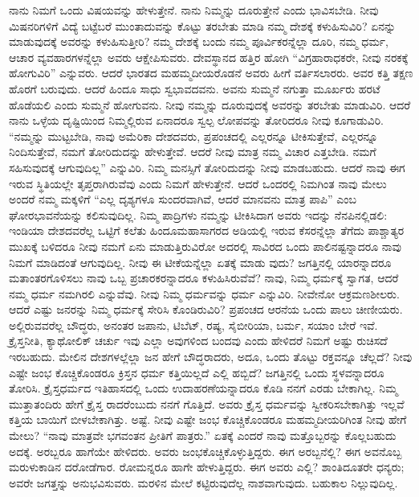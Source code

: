 ನಾನು ನಿಮಗೆ ಒಂದು ವಿಷಯವನ್ನು ಹೇಳುತ್ತೇನೆ. ನಾನು ನಿಮ್ಮನ್ನು ದೂರುತ್ತೇನೆ ಎಂದು ಭಾವಿಸಬೇಡಿ. ನೀವು ಮಿಷನರಿಗಳಿಗೆ ವಿದ್ಯೆ ಬಟ್ಟೆಬರೆ ಮುಂತಾದುವನ್ನು ಕೊಟ್ಟು ತರಬೇತು ಮಾಡಿ ನಮ್ಮ ದೇಶಕ್ಕೆ ಕಳುಹಿಸುವಿರಿ? ಏನನ್ನು ಮಾಡುವುದಕ್ಕೆ ಅವರನ್ನು ಕಳುಹಿಸುತ್ತೀರಿ? ನಮ್ಮ ದೇಶಕ್ಕೆ ಬಂದು ನಮ್ಮ ಪೂರ್ವಿಕರನ್ನೆಲ್ಲಾ ದೂರಿ, ನಮ್ಮ ಧರ್ಮ, ಆಚಾರ ವ್ಯವಹಾರಗಳನ್ನೆಲ್ಲಾ ಅವರು ಆಕ್ಷೇಪಿಸುವರು. ದೇವಸ್ಥಾನದ ಹತ್ತಿರ ಹೋಗಿ “ವಿಗ್ರಹಾರಾಧಕರೇ, ನೀವು ನರಕಕ್ಕೆ ಹೋಗುವಿರಿ” ಎನ್ನುವರು. ಆದರೆ ಭಾರತದ ಮಹಮ್ಮದೀಯರೊಡನೆ ಅವರು ಹೀಗೆ ವರ್ತಿಸಲಾರರು. ಅವರ ಕತ್ತಿ ತಕ್ಷಣ ಹೊರಗೆ ಬರುವುದು. ಆದರೆ ಹಿಂದೂ ಸಾಧು ಸ್ವಭಾವದವನು. ಅವನು ಸುಮ್ಮನೆ ನಗುತ್ತಾ ಮೂರ್ಖರು ಹರಟೆ ಹೊಡೆಯಲಿ ಎಂದು ಸುಮ್ಮನೆ ಹೋಗುವನು. ನೀವು ನಮ್ಮನ್ನು ದೂರುವುದಕ್ಕೆ ಅವರನ್ನು ತರಬೇತು ಮಾಡುವಿರಿ. ಆದರೆ ನಾನು ಒಳ್ಳೆಯ ದೃಷ್ಟಿಯಿಂದ ನಿಮ್ಮಲ್ಲಿರುವ ಏನಾದರೂ ಸ್ವಲ್ಪ ಲೋಪವನ್ನು ತೋರಿದರೂ ನೀವು ಕೂಗಾಡುವಿರಿ. “ನಮ್ಮನ್ನು ಮುಟ್ಟಬೇಡಿ, ನಾವು ಅಮೆರಿಕಾ ದೇಶದವರು, ಪ್ರಪಂಚದಲ್ಲಿ ಎಲ್ಲರನ್ನೂ ಟೀಕಿಸುತ್ತೇವೆ, ಎಲ್ಲರನ್ನೂ ನಿಂದಿಸುತ್ತೇವೆ, ನಮಗೆ ತೋರಿದುದನ್ನು ಹೇಳುತ್ತೇವೆ. ಆದರೆ ನೀವು ಮಾತ್ರ ನಮ್ಮ ವಿಚಾರ ಎತ್ತಬೇಡಿ. ನಮಗೆ ಸಹಿಸುವುದಕ್ಕೆ ಆಗುವುದಿಲ್ಲ” ಎನ್ನುವಿರಿ. ನಿಮ್ಮ ಮನಸ್ಸಿಗೆ ತೋರಿದುದನ್ನು ನೀವು ಮಾಡಬಹುದು. ಆದರೆ ನಾವು ಈಗ ಇರುವ ಸ್ಥಿತಿಯಲ್ಲೇ ತೃಪ್ತರಾಗಿರುವೆವು ಎಂದು ನಿಮಗೆ ಹೇಳುತ್ತೇನೆ. ಆದರೆ ಒಂದರಲ್ಲಿ ನಿಮಗಿಂತ ನಾವು ಮೇಲು ಅಂದರೆ ನಮ್ಮ ಮಕ್ಕಳಿಗೆ “ಎಲ್ಲ ದೃಶ್ಯಗಳೂ ಸುಂದರವಾಗಿವೆ, ಆದರೆ ಮಾನವನು ಮಾತ್ರ ಪಾಪಿ” ಎಂಬ ಘೋರಭಾವನೆಯನ್ನು ಕಲಿಸುವುದಿಲ್ಲ. ನಿಮ್ಮ ಪಾದ್ರಿಗಳು ನಮ್ಮನ್ನು ಟೀಕಿಸಿದಾಗ ಅವರು ಇದನ್ನು ನೆನಪಿನಲ್ಲಿಡಲಿ: ಇಂಡಿಯಾ ದೇಶದವರೆಲ್ಲ ಒಟ್ಟಿಗೆ ಕಲೆತು ಹಿಂದೂಮಹಾಸಾಗರದ ಅಡಿಯಲ್ಲಿ ಇರುವ ಕೆಸರನ್ನೆಲ್ಲಾ ತೆಗೆದು ಪಾಶ್ಚಾತ್ಯರ ಮುಖಕ್ಕೆ ಬಳಿದರೂ ನೀವು ನಮಗೆ ಏನು ಮಾಡುತ್ತಿರುವಿರೋ ಅದರಲ್ಲಿ ಸಾವಿರದ ಒಂದು ಪಾಲಿನಷ್ಟನ್ನಾದರೂ ನಾವು ನಿಮಗೆ ಮಾಡಿದಂತೆ ಆಗುವುದಿಲ್ಲ. ನೀವು ಈ ಟೀಕೆಯನ್ನೆಲ್ಲಾ ಏತಕ್ಕೆ ಮಾಡು ವುದು? ಜಗತ್ತಿನಲ್ಲಿ ಯಾರನ್ನಾದರೂ ಮತಾಂತರಗೊಳಿಸಲು ನಾವು ಒಬ್ಬ ಪ್ರಚಾರಕರನ್ನಾದರೂ ಕಳುಹಿಸಿರುವೆವೆ? ನಾವು, ನಿಮ್ಮ ಧರ್ಮಕ್ಕೆ ಸ್ವಾಗತ, ಆದರೆ ನಮ್ಮ ಧರ್ಮ ನಮಗಿರಲಿ ಎನ್ನುವೆವು. ನೀವು ನಿಮ್ಮ ಧರ್ಮವನ್ನು ಧರ್ಮ ಎನ್ನುವಿರಿ. ನೀವೇನೋ ಆಕ್ರಮಣಶೀಲರು. ಆದರೆ ಎಷ್ಟು ಜನರನ್ನು ನಿಮ್ಮ ಧರ್ಮಕ್ಕೆ ಸೇರಿಸಿ ಕೊಂಡಿರುವಿರಿ? ಪ್ರಪಂಚದ ಆರನೆಯ ಒಂದು ಪಾಲು ಚೀಣೀಯರು. ಅಲ್ಲಿರುವವರೆಲ್ಲ ಬೌದ್ಧರು, ಅನಂತರ ಜಪಾನು, ಟಿಬೆಟ್​, ರಷ್ಯ, ಸೈಬೀರಿಯಾ, ಬರ್ಮ, ಸಯಾಂ ಬೇರೆ ಇವೆ. ಕ್ರೈಸ್ತನೀತಿ, ಕ್ಯಾಥೋಲಿಕ್​ ಚರ್ಚು ಇವು ಎಲ್ಲಾ ಅವುಗಳಿಂದ ಬಂದವು ಎಂದು ಹೇಳಿದರೆ ನಿಮಗೆ ಅಷ್ಟು ರುಚಿಸದೆ ಇರಬಹುದು. ಮೇಲಿನ ದೇಶಗಳಲ್ಲೆಲ್ಲಾ ಜನ ಹೇಗೆ ಬೌದ್ಧರಾದರು, ಅದೂ, ಒಂದು ತೊಟ್ಟು ರಕ್ತವನ್ನೂ ಚೆಲ್ಲದೆ? ನೀವು ಎಷ್ಟೇ ಜಂಭ ಕೊಚ್ಚಿಕೊಂಡರೂ ಕ್ರಿಸ್ತನ ಧರ್ಮ ಕತ್ತಿಯಿಲ್ಲದೆ ಎಲ್ಲಿ ಹಬ್ಬಿದೆ? ಜಗತ್ತಿನಲ್ಲಿ ಒಂದು ಸ್ಥಳವನ್ನಾದರೂ ತೋರಿಸಿ. ಕ್ರೈಸ್ತಧರ್ಮದ ಇತಿಹಾಸದಲ್ಲಿ ಒಂದು ಉದಾಹರಣೆಯನ್ನಾದರೂ ಕೊಡಿ ನನಗೆ ಎರಡು ಬೇಕಾಗಿಲ್ಲ. ನಿಮ್ಮ ಮುತ್ತಾತಂದಿರು ಹೇಗೆ ಕ್ರೈಸ್ತ ರಾದರೆಂಬುದು ನನಗೆ ಗೊತ್ತಿದೆ. ಅವರು ಕ್ರೈಸ್ತ ಧರ್ಮವನ್ನು ಸ್ವೀಕರಿಸಬೇಕಾಗಿತ್ತು ಇಲ್ಲವೆ ಕತ್ತಿಯ ಬಾಯಿಗೆ ಬೀಳಬೇಕಾಗಿತ್ತು. ಅಷ್ಟೆ. ನೀವು ಎಷ್ಟೇ ಜಂಭ ಕೊಚ್ಚಿಕೊಂಡರೂ ಮಹಮ್ಮದೀಯರಿಗಿಂತ ನೀವು ಹೇಗೆ ಮೇಲು? “ನಾವು ಮಾತ್ರವೇ ಭಗವಂತನ ಪ್ರೀತಿಗೆ ಪಾತ್ರರು.” ಏತಕ್ಕೆ ಎಂದರೆ ನಾವು ಮತ್ತೊಬ್ಬರನ್ನು ಕೊಲ್ಲಬಹುದು ಅದಕ್ಕೆ. ಅರಬ್ಬರೂ ಹಾಗೆಯೇ ಹೇಳಿದರು. ಅವರು ಜಂಭಕೊಚ್ಚಿಕೊಳ್ಳುತ್ತಿದ್ದರು. ಈಗ ಅರಬ್ಬನೆಲ್ಲಿ? ಈಗ ಅವನೊಬ್ಬ ಮರುಳುಕಾಡಿನ ದರೋಡೆಗಾರ. ರೋಮನ್ನರೂ ಹಾಗೇ ಹೇಳುತ್ತಿದ್ದರು. ಈಗ ಅವರು ಎಲ್ಲಿ? ಶಾಂತಿದೂತರೇ ಧನ್ಯರು; ಅವರೇ ಜಗತ್ತನ್ನು ಅನುಭವಿಸುವರು. ಮರಳಿನ ಮೇಲೆ ಕಟ್ಟಿರುವುದೆಲ್ಲ ನಾಶವಾಗುವುದು. ಬಹುಕಾಲ ನಿಲ್ಲುವುದಿಲ್ಲ.


